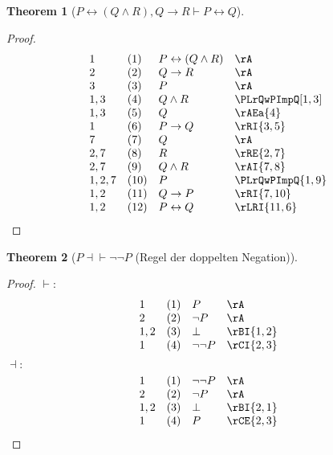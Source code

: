 \documentclass{book}
\theoremstyle{plain}
\newtheorem{theorem}{Theorem}
\theoremstyle{remark}
\theoremstyle{definition}
\begin{document}
\label{PLrLpQAndRRpwQToRImpPLrQ}
\begin{theorem}[\(P\leftrightarrow (Q\land R), Q\rightarrow R\vdash P\leftrightarrow Q\)]
\end{theorem}
\begin{proof}
	\[
	\begin{array}{llll}
		1 & (1) & P\leftrightarrow (Q\land R) & \rA \\
		2 & (2) & Q\rightarrow R & \rA \\
		3 & (3) & P & \rA \\
		1,3 & (4) & Q\land R & \PLrQwPImpQ[1,3] \\
		1,3 & (5) & Q & \rAEa{4} \\
		1 & (6) & P\rightarrow Q & \rRI{3,5} \\
		7 & (7) & Q & \rA \\
		2,7 & (8) & R & \rRE{2,7} \\
		2,7 & (9) & Q\land R & \rAI{7,8} \\
		1,2,7 & (10) & P & \PLrQwPImpQ{1,9} \\
		1,2 & (11) & Q\rightarrow P & \rRI{7,10} \\
		1,2 & (12) & P\leftrightarrow Q & \rLRI{11,6} \\
	\end{array}		
	\]
\end{proof}


\label{rule:DN}
\begin{theorem}[\(P\dashv\vdash \neg\neg P\) (Regel der doppelten Negation)]
\end{theorem}
\begin{proof}
	\(\vdash:\)
	\[
	\begin{array}{llll}
		1 & (1) & P & \rA \\
		2 & (2) & \neg P & \rA \\
		1,2 & (3) & \bot & \rBI{1,2} \\
		1 & (4) & \neg\neg P & \rCI{2,3} \\
	\end{array}
	\]
	\(\dashv:\)
	\[
	\begin{array}{llll}
		1 & (1) & \neg\neg P & \rA \\
		2 & (2) & \neg P & \rA \\
		1,2 & (3) & \bot & \rBI{2,1} \\
		1 & (4) & P & \rCE{2,3} \\
	\end{array}
	\]
\end{proof}
\end{document}
